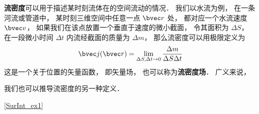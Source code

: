 

\textbf{流密度}可以用于描述某时刻流体在的空间流动的情况． 我们以水流为例， 在一条河流或管道中， 某时刻三维空间中任意一点 $\bvec r$ 处， 都对应一个水流速度 $\bvec v$， 如果我们在该点放置一个垂直于速度的微小截面， 令其面积为 $\Delta S$， 在一段微小时间 $\Delta t$ 内流经截面的质量为 $\Delta m$， 那么流密度可以用极限定义为
\begin{equation}\label{CrnDen_eq1}
\bvec j(\bvec r) = \lim_{\Delta S, \Delta t \to 0} \frac{\Delta m}{\Delta S \Delta t}
\end{equation}
这是一个关于位置的矢量函数， 即矢量场， 也可以称为\textbf{流密度场}． 广义来说， 

我们也可以推导流密度的另一种定义．

\autoref{SurInt_ex1}